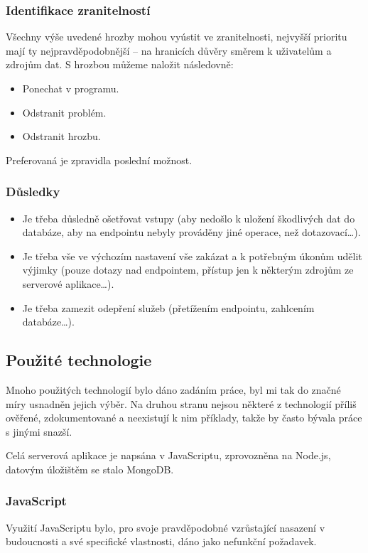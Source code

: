 \subsubsection{Identifikace zranitelností}
Všechny výše uvedené hrozby mohou vyústit ve zranitelnosti, nejvyšší prioritu mají ty nejpravděpodobnější -- na hranicích důvěry směrem k uživatelům a zdrojům dat. S hrozbou můžeme naložit následovně:
\begin{itemize}
 \item Ponechat v programu.
 \item Odstranit problém.
 \item Odstranit hrozbu.
\end{itemize}
Preferovaná je zpravidla poslední možnost.

\subsubsection{Důsledky}
\begin{itemize}
 \item Je třeba důsledně ošetřovat vstupy (aby nedošlo k uložení škodlivých dat do databáze, aby na  endpointu nebyly prováděny jiné operace, než dotazovací\dots).
 \item Je třeba vše ve výchozím nastavení vše zakázat a k potřebným úkonům udělit výjimky (pouze dotazy nad  endpointem, přístup jen k některým zdrojům ze serverové aplikace\dots).
 \item Je třeba zamezit odepření služeb (přetížením  endpointu, zahlcením databáze\dots).
\end{itemize}


\subsection{Použité technologie}
\label{sec:server:technologie}
Mnoho použitých technologií bylo dáno zadáním práce, byl mi tak do značné míry usnadněn jejich výběr. Na druhou stranu nejsou některé z technologií příliš ověřené, zdokumentované a neexistují k nim příklady, takže by často bývala práce s jinými snazší.

Celá serverová aplikace je napsána v JavaScriptu, zprovozněna na Node.js, datovým úložištěm se stalo MongoDB.

\subsubsection{JavaScript}
Využití JavaScriptu bylo, pro svoje pravděpodobné vzrůstající nasazení v budoucnosti a své specifické vlastnosti, dáno jako nefunkční požadavek.

